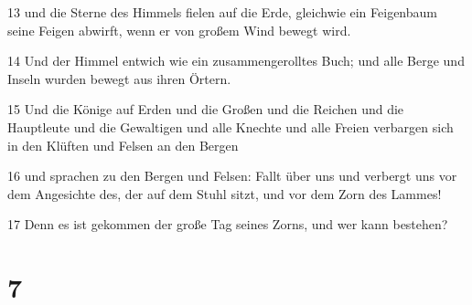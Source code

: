 \par 13 und die Sterne des Himmels fielen auf die Erde, gleichwie ein Feigenbaum seine Feigen abwirft, wenn er von großem Wind bewegt wird.
\par 14 Und der Himmel entwich wie ein zusammengerolltes Buch; und alle Berge und Inseln wurden bewegt aus ihren Örtern.
\par 15 Und die Könige auf Erden und die Großen und die Reichen und die Hauptleute und die Gewaltigen und alle Knechte und alle Freien verbargen sich in den Klüften und Felsen an den Bergen
\par 16 und sprachen zu den Bergen und Felsen: Fallt über uns und verbergt uns vor dem Angesichte des, der auf dem Stuhl sitzt, und vor dem Zorn des Lammes!
\par 17 Denn es ist gekommen der große Tag seines Zorns, und wer kann bestehen?

\chapter{7}

